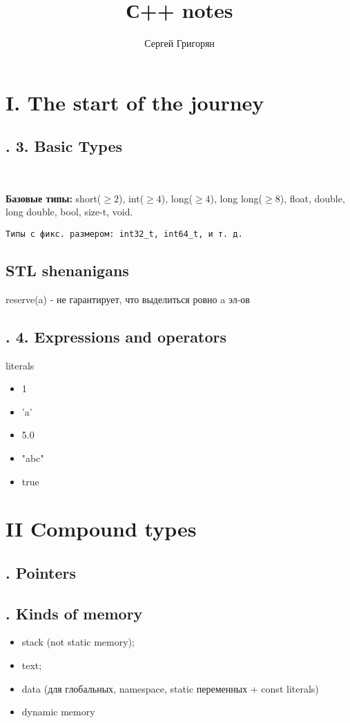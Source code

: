 \documentclass[12pt]{article}
\title{С++ notes}
\author{Сергей Григорян}
\theoremstyle{definition}
\theoremstyle{definition}
\begin{document}
\maketitle
\newpage
\section{I. The start of the journey}

\subsection{. 3. Basic Types}
~\newline

\textbf{Базовые типы:} short($\geq 2$), int($\geq 4$), long($\geq 4$), long long($\geq 8$), float, double, long double, bool, size-t, void.
\begin{verbatim}
Типы с фикс. размером: int32_t, int64_t, и т. д.
\end{verbatim}
\subsection{STL shenanigans}
reserve(a) - не гарантирует, что выделиться ровно a эл-ов

\subsection{. 4. Expressions and operators}
literals
\begin{itemize}
    \item 1
    \item 'a'
    \item 5.0
    \item "abc"
    \item true
\end{itemize}

\section{II Compound types}
\subsection{. Pointers}
\subsection{. Kinds of memory}

\begin{itemize}
  \item stack (not static memory);
  \item text;
  \item data (для глобальных, namespace, static переменных + const literals)
  \item dynamic memory
\end{itemize}
\end{document}
